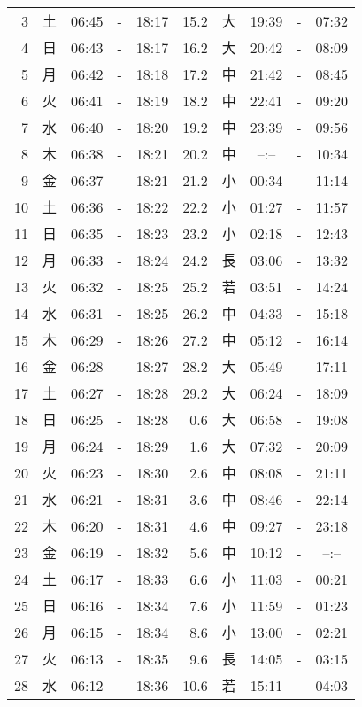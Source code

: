 \documentclass[a4j,10pt]{jsarticle}
\begin{document}
\begin{center}
\begin{table}[ht]
\begin{center}
\begin{tabular}{|rc|ccc|rc|ccc|}
  3 & 土 & 06:45 &-& 18:17 & 15.2 & 大 & 19:39 &-& 07:32 \\
  4 & 日 & 06:43 &-& 18:17 & 16.2 & 大 & 20:42 &-& 08:09 \\
  5 & 月 & 06:42 &-& 18:18 & 17.2 & 中 & 21:42 &-& 08:45 \\
  6 & 火 & 06:41 &-& 18:19 & 18.2 & 中 & 22:41 &-& 09:20 \\
  7 & 水 & 06:40 &-& 18:20 & 19.2 & 中 & 23:39 &-& 09:56 \\
  8 & 木 & 06:38 &-& 18:21 & 20.2 & 中 &  --:--  &-& 10:34 \\
  9 & 金 & 06:37 &-& 18:21 & 21.2 & 小 & 00:34 &-& 11:14 \\
 10 & 土 & 06:36 &-& 18:22 & 22.2 & 小 & 01:27 &-& 11:57 \\
 11 & 日 & 06:35 &-& 18:23 & 23.2 & 小 & 02:18 &-& 12:43 \\
 12 & 月 & 06:33 &-& 18:24 & 24.2 & 長 & 03:06 &-& 13:32 \\
 13 & 火 & 06:32 &-& 18:25 & 25.2 & 若 & 03:51 &-& 14:24 \\
 14 & 水 & 06:31 &-& 18:25 & 26.2 & 中 & 04:33 &-& 15:18 \\
 15 & 木 & 06:29 &-& 18:26 & 27.2 & 中 & 05:12 &-& 16:14 \\
 16 & 金 & 06:28 &-& 18:27 & 28.2 & 大 & 05:49 &-& 17:11 \\
 17 & 土 & 06:27 &-& 18:28 & 29.2 & 大 & 06:24 &-& 18:09 \\
 18 & 日 & 06:25 &-& 18:28 &  0.6 & 大 & 06:58 &-& 19:08 \\
 19 & 月 & 06:24 &-& 18:29 &  1.6 & 大 & 07:32 &-& 20:09 \\
 20 & 火 & 06:23 &-& 18:30 &  2.6 & 中 & 08:08 &-& 21:11 \\
 21 & 水 & 06:21 &-& 18:31 &  3.6 & 中 & 08:46 &-& 22:14 \\
 22 & 木 & 06:20 &-& 18:31 &  4.6 & 中 & 09:27 &-& 23:18 \\
 23 & 金 & 06:19 &-& 18:32 &  5.6 & 中 & 10:12 &-&  --:--  \\
 24 & 土 & 06:17 &-& 18:33 &  6.6 & 小 & 11:03 &-& 00:21 \\
 25 & 日 & 06:16 &-& 18:34 &  7.6 & 小 & 11:59 &-& 01:23 \\
 26 & 月 & 06:15 &-& 18:34 &  8.6 & 小 & 13:00 &-& 02:21 \\
 27 & 火 & 06:13 &-& 18:35 &  9.6 & 長 & 14:05 &-& 03:15 \\
 28 & 水 & 06:12 &-& 18:36 & 10.6 & 若 & 15:11 &-& 04:03 \\

\end{tabular}
\end{center}
\end{table}
\end{center}
\end{document}
